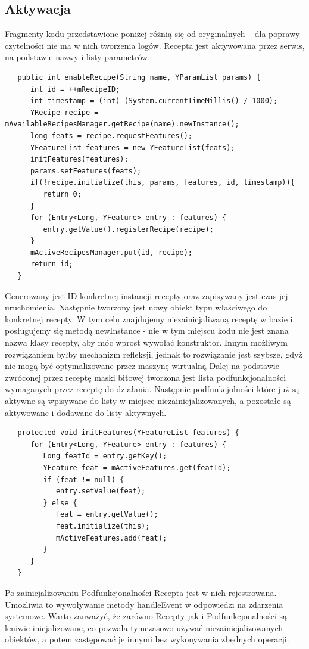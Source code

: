 \documentclass[11pt,a4paper,polish,thesis]{dcsbook}
\begin{document}
\subsection{Aktywacja}
Fragmenty kodu przedstawione poniżej różnią się od oryginalnych -- dla poprawy czytelności nie ma w nich tworzenia logów.
Recepta jest aktywowana przez serwis, na podstawie nazwy i listy parametrów.
\begin{verbatim}
   public int enableRecipe(String name, YParamList params) {
      int id = ++mRecipeID;
      int timestamp = (int) (System.currentTimeMillis() / 1000);
      YRecipe recipe = mAvailableRecipesManager.getRecipe(name).newInstance();
      long feats = recipe.requestFeatures();
      YFeatureList features = new YFeatureList(feats);
      initFeatures(features);
      params.setFeatures(feats);
      if(!recipe.initialize(this, params, features, id, timestamp)){
         return 0;
      }
      for (Entry<Long, YFeature> entry : features) {
         entry.getValue().registerRecipe(recipe);
      }
      mActiveRecipesManager.put(id, recipe);
      return id;
   }
\end{verbatim}
Generowany jest ID konkretnej instancji recepty oraz zapisywany jest czas jej uruchomienia.
Następnie tworzony jest nowy obiekt typu właściwego do konkretnej recepty. W tym celu znajdujemy niezainicjaliwaną receptę w bazie i posługujemy się metodą newInstance - nie w tym miejscu kodu nie jest znana nazwa klasy recepty, aby móc wprost wywołać konstruktor. Innym możliwym rozwiązaniem byłby mechanizm refleksji, jednak to rozwiązanie jest szybsze, gdyż nie mogą być optymalizowane przez maszynę wirtualną \cite{java}
Dalej na podstawie zwróconej przez receptę maski bitowej tworzona jest lista podfunkcjonalności wymaganych przez receptę do działania. Następnie podfunkcjolności które już są aktywne są wpisywane do listy w miejsce niezainicjalizowanych, a pozostałe są aktywowane i dodawane do listy aktywnych.

\begin{verbatim}
   protected void initFeatures(YFeatureList features) {
      for (Entry<Long, YFeature> entry : features) {
         Long featId = entry.getKey();
         YFeature feat = mActiveFeatures.get(featId);
         if (feat != null) {
            entry.setValue(feat);
         } else {
            feat = entry.getValue();
            feat.initialize(this);
            mActiveFeatures.add(feat);
         }
      }
   }
\end{verbatim}
Po zainicjalizowaniu Podfunkcjonalności Recepta jest w nich rejestrowana. Umożliwia to wywoływanie metody handleEvent w odpowiedzi na zdarzenia systemowe. 
Warto zauważyć, że zarówno Recepty jak i Podfunkcjonalności są leniwie inicjalizowane, co pozwala tymczasowo używać niezainicjalizowanych obiektów, a potem zastępować je innymi bez wykonywania zbędnych operacji. 
\end{document}
